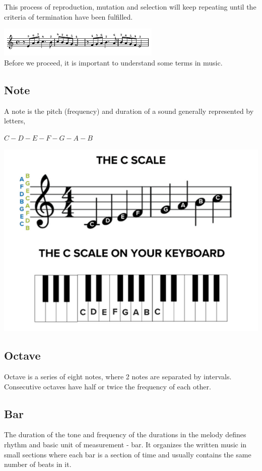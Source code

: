 \documentclass[conference]{IEEEtran}
\begin{document}
This process of reproduction, mutation and selection will keep repeating until the criteria of termination have been fulfilled.

\includegraphics{music.png}\\

Before we proceed, it is important to understand some terms in music.

\subsection{Note}
A note is the pitch (frequency) and duration of a sound generally represented by letters,
\begin{center}
    $C-D-E-F-G-A-B$
\end{center}
\includegraphics[width=7 cm, height=7 cm]{notes.png}

\subsection{Octave}
Octave is a series of eight notes, where 2 notes are separated by intervals. Consecutive octaves have half or twice the frequency of each other.

\subsection{Bar}
The duration of the tone and frequency of the durations in the melody defines rhythm and basic unit of measurement - bar. It organizes the written music in small sections where each bar is a section of time and usually contains the same number of beats in it.
\end{document}
